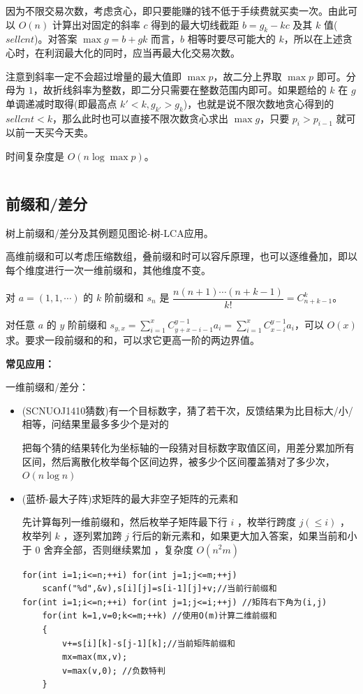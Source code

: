 \documentclass[twocolumn,10pt]{ctexart}
\begin{document}
因为不限交易次数，考虑贪心，即只要能赚的钱不低于手续费就买卖一次。由此可以 $O(n)$ 计算出对固定的斜率 $c$ 得到的最大切线截距 $b=g_k-kc$ 及其 $k$ 值($sellcnt$)。对答案 $\max g = b+gk$ 而言，$b$ 相等时要尽可能大的 $k$，所以在上述贪心时，在利润最大化的同时，应当再最大化交易次数。

注意到斜率一定不会超过增量的最大值即 $\max p$，故二分上界取 $\max p$ 即可。分母为 $1$，故折线斜率为整数，即二分只需要在整数范围内即可。如果题给的 $k$ 在 $g$ 单调递减时取得(即最高点 $k' < k,g_{k'} > g_k$)，也就是说不限次数地贪心得到的 $sellcnt < k$，那么此时也可以直接不限次数贪心求出 $\max g$，只要 $p_i > p_{i-1}$ 就可以前一天买今天卖。

时间复杂度是 $O(n\log \max p)$。

\inputminted{cpp}{code/ext_070.cpp}

\subsection{前缀和/差分}

\begin{notebox}
树上前缀和/差分及其例题见图论-树-LCA应用。
\end{notebox}

高维前缀和可以考虑压缩数组，叠前缀和时可以容斥原理，也可以逐维叠加，即以每个维度进行一次一维前缀和，其他维度不变。

对 $a=(1,1,\cdots)$ 的 $k$ 阶前缀和 $s_n$ 是 $\dfrac{n(n+1)\cdots(n+k-1)}{k!}=C_{n+k-1}^k$。

对任意 $a$ 的 $y$ 阶前缀和 $s_{y,\allowbreak{}x}=\sum_{i=1}^xC_{y+x-i-1}^{y-1}a_i=\sum_{i=1}^xC_{x-i}^{y-1}a_i$，可以 $O(x)$ 求。要求一段前缀和的和，可以求它更高一阶的两边界值。

\textbf{常见应用：}

一维前缀和/差分：

\begin{itemize}
\item (SCNUOJ1410猜数)有一个目标数字，猜了若干次，反馈结果为比目标大/小/相等，问结果里最多多少个是对的

把每个猜的结果转化为坐标轴的一段猜对目标数字取值区间，用差分累加所有区间，然后离散化枚举每个区间边界，被多少个区间覆盖猜对了多少次， $O(n\log n)$
\end{itemize}

\begin{itemize}
\item (蓝桥-最大子阵)求矩阵的最大非空子矩阵的元素和

先计算每列一维前缀和，然后枚举子矩阵最下行 $i$ ，枚举行跨度 $j(\le i)$ ，枚举列 $k$ ，逐列累加跨 $j$ 行后的新元素和，如果更大加入答案，如果当前和小于 $0$ 舍弃全部，否则继续累加 ，复杂度 $O(n^2 m)$

\begin{verbatim}
for(int i=1;i<=n;++i) for(int j=1;j<=m;++j) 
    scanf("%d",&v),s[i][j]=s[i-1][j]+v;//当前行前缀和 
for(int i=1;i<=n;++i) for(int j=1;j<=i;++j) //矩阵右下角为(i,j) 
    for(int k=1,v=0;k<=m;++k) //使用O(m)计算二维前缀和 
    {
        v+=s[i][k]-s[j-1][k];//当前矩阵前缀和 
        mx=max(mx,v);
        v=max(v,0); //负数特判 
    }
\end{verbatim}
\end{itemize}
\end{document}
